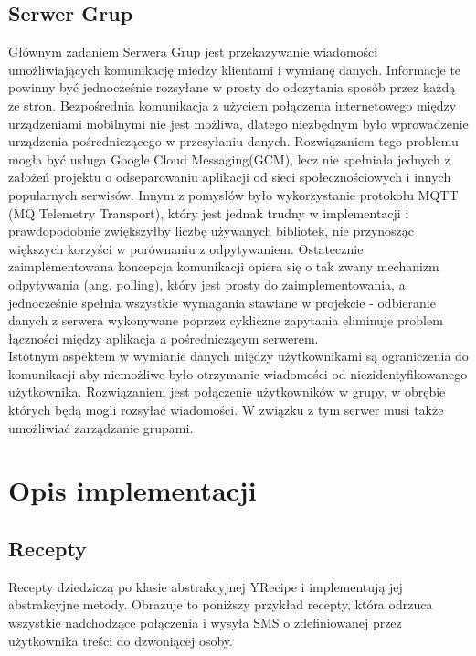 \documentclass[11pt,a4paper,polish,thesis]{dcsbook}
\begin{document}
\section{Serwer Grup}
Głównym zadaniem Serwera Grup jest przekazywanie wiadomości umożliwiających komunikację miedzy klientami i wymianę danych. 
Informacje te powinny być jednocześnie rozsyłane w prosty do odczytania sposób przez każdą ze stron.
Bezpośrednia komunikacja z użyciem połączenia internetowego między urządzeniami mobilnymi nie jest możliwa, dlatego niezbędnym było wprowadzenie urządzenia pośredniczącego w przesyłaniu danych. 
Rozwiązaniem tego problemu mogła być usługa Google Cloud Messaging(GCM), lecz nie spełniała jednych z założeń projektu o odseparowaniu aplikacji od sieci społecznościowych i innych popularnych serwisów.
Innym z pomysłów było wykorzystanie protokołu MQTT (MQ Telemetry Transport), który jest jednak trudny w implementacji i prawdopodobnie zwiększyłby liczbę używanych bibliotek, nie przynosząc większych korzyści w porównaniu z odpytywaniem.
Ostatecznie zaimplementowana koncepcja komunikacji opiera się o tak zwany mechanizm odpytywania (ang. polling), który jest prosty do zaimplementowania, a jednocześnie spełnia wszystkie wymagania stawiane w projekcie - odbieranie danych z serwera wykonywane poprzez cykliczne zapytania eliminuje problem łączności między aplikacja a pośredniczącym serwerem.
\\
Istotnym aspektem w wymianie danych między użytkownikami są ograniczenia do komunikacji aby niemożliwe było otrzymanie wiadomości od niezidentyfikowanego użytkownika.
Rozwiązaniem jest połączenie użytkowników w grupy, w obrębie których będą mogli rozsyłać wiadomości. W związku z tym serwer musi także umożliwiać zarządzanie grupami.

\chapter{Opis implementacji}

\section{Recepty}
Recepty dziedziczą po klasie abstrakcyjnej YRecipe i implementują jej abstrakcyjne metody. Obrazuje to poniższy przykład recepty, która odrzuca wszystkie nadchodzące połączenia i wysyła SMS o zdefiniowanej przez użytkownika treści do dzwoniącej osoby.
\end{document}
